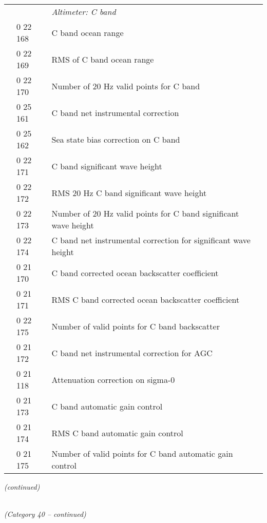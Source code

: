 \begin{longtable}[]{@{}llll@{}}
& & \emph{Altimeter: C band} &\tabularnewline
& 0 22 168 & C band ocean range &\tabularnewline
& 0 22 169 & RMS of C band ocean range &\tabularnewline
& 0 22 170 & Number of 20 Hz valid points for C band &\tabularnewline
& 0 25 161 & C band net instrumental correction &\tabularnewline
& 0 25 162 & Sea state bias correction on C band &\tabularnewline
& 0 22 171 & C band significant wave height &\tabularnewline
& 0 22 172 & RMS 20 Hz C band significant wave height &\tabularnewline
& 0 22 173 & Number of 20 Hz valid points for C band significant wave height &\tabularnewline
& 0 22 174 & C band net instrumental correction for significant wave height &\tabularnewline
& 0 21 170 & C band corrected ocean backscatter coefficient &\tabularnewline
& 0 21 171 & RMS C band corrected ocean backscatter coefficient &\tabularnewline
& 0 22 175 & Number of valid points for C band backscatter &\tabularnewline
& 0 21 172 & C band net instrumental correction for AGC &\tabularnewline
& 0 21 118 & Attenuation correction on sigma-0 &\tabularnewline
& 0 21 173 & C band automatic gain control &\tabularnewline
& 0 21 174 & RMS C band automatic gain control &\tabularnewline
& 0 21 175 & Number of valid points for C band automatic gain control &\tabularnewline
\bottomrule
\end{longtable}

\emph{(continued)}

\emph{\\
(Category 40 -- continued)}

